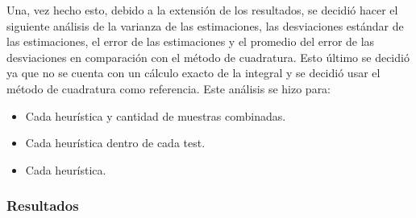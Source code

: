 \documentclass{article}
\begin{document}
Una, vez hecho esto, debido a la extensión de los resultados, se decidió hacer el siguiente análisis de la varianza de las estimaciones, las desviaciones estándar de las estimaciones, el error de las estimaciones y el promedio del error de las desviaciones en comparación con el método de cuadratura.
Esto último se decidió ya que no se cuenta con un cálculo exacto de la integral y se decidió usar el método de cuadratura como referencia.
Este análisis se hizo para:

\begin{itemize}
    \item Cada heurística y cantidad de muestras combinadas.
    \item Cada heurística dentro de cada test.
    \item Cada heurística.
\end{itemize}

\subsubsection{Resultados}
\end{document}
